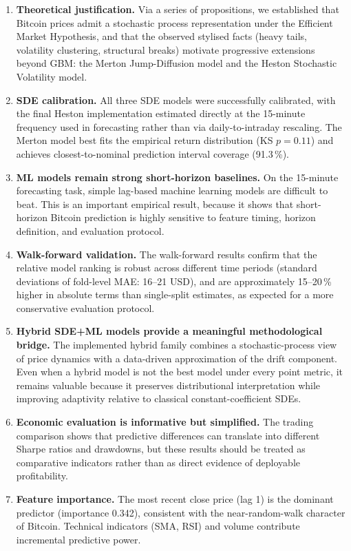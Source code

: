 \documentclass[12pt, a4paper, oneside]{report}
\theoremstyle{plain}
\theoremstyle{definition}
\theoremstyle{remark}
\begin{document}
\begin{enumerate}[leftmargin=1.25cm, label=\arabic*.]
  \item \textbf{Theoretical justification.}  Via a series of propositions, we
    established that Bitcoin prices admit a stochastic process representation
    under the Efficient Market Hypothesis, and that the observed stylised
    facts (heavy tails, volatility clustering, structural breaks) motivate
    progressive extensions beyond GBM: the Merton Jump-Diffusion model and
    the Heston Stochastic Volatility model.

  \item \textbf{SDE calibration.}  All three SDE models were successfully
    calibrated, with the final Heston implementation estimated directly at the
    15-minute frequency used in forecasting rather than via daily-to-intraday
    rescaling.  The Merton model best fits the empirical
    return distribution (KS $p = 0.11$) and achieves closest-to-nominal
    prediction interval coverage (91.3\,\%).

  \item \textbf{ML models remain strong short-horizon baselines.}  On the
    15-minute forecasting task, simple lag-based machine learning models are
    difficult to beat.  This is an important empirical result, because it shows
    that short-horizon Bitcoin prediction is highly sensitive to feature timing,
    horizon definition, and evaluation protocol.

  \item \textbf{Walk-forward validation.}  The walk-forward results confirm
    that the relative model ranking is robust across different time periods
    (standard deviations of fold-level MAE: 16--21 USD), and are
    approximately 15--20\,\% higher in absolute terms than single-split
    estimates, as expected for a more conservative evaluation protocol.

  \item \textbf{Hybrid SDE+ML models provide a meaningful methodological
    bridge.}  The implemented hybrid family combines a stochastic-process view
    of price dynamics with a data-driven approximation of the drift component.
    Even when a hybrid model is not the best model under every point metric, it
    remains valuable because it preserves distributional interpretation while
    improving adaptivity relative to classical constant-coefficient SDEs.

  \item \textbf{Economic evaluation is informative but simplified.}  The
    trading comparison shows that predictive differences can translate into
    different Sharpe ratios and drawdowns, but these results should be treated
    as comparative indicators rather than as direct evidence of deployable
    profitability.

  \item \textbf{Feature importance.}  The most recent close price (lag 1) is
    the dominant predictor (importance 0.342), consistent with the near-random-walk
    character of Bitcoin.  Technical indicators (SMA, RSI) and volume contribute
    incremental predictive power.
\end{enumerate}
\end{document}
